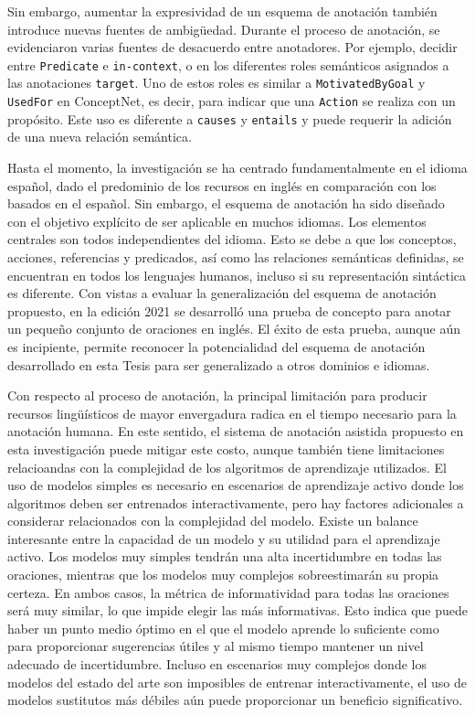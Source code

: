 Sin embargo, aumentar la expresividad de un esquema de anotación también introduce nuevas fuentes de ambigüedad.
Durante el proceso de anotación, se evidenciaron varias fuentes de desacuerdo entre anotadores.
Por ejemplo, decidir entre \texttt{Predicate} e \texttt{in-context}, o en los diferentes roles semánticos asignados a las anotaciones \texttt{target}.
Uno de estos roles es similar a \texttt{MotivatedByGoal} y \texttt{UsedFor} en ConceptNet, es decir, para indicar que una \texttt{Action} se realiza con un propósito.
Este uso es diferente a \texttt{causes} y \texttt{entails} y puede requerir la adición de una nueva relación semántica.

Hasta el momento, la investigación se ha centrado fundamentalmente en el idioma español, dado el predominio de los recursos en inglés en comparación con los basados en el español.
Sin embargo, el esquema de anotación ha sido diseñado con el objetivo explícito de ser aplicable en muchos idiomas.
Los elementos centrales son todos independientes del idioma.
Esto se debe a que los conceptos, acciones, referencias y predicados, así como las relaciones semánticas definidas, se encuentran en todos los lenguajes humanos, incluso si su representación sintáctica es diferente.
Con vistas a evaluar la generalización del esquema de anotación propuesto, en la edición 2021 se desarrolló una prueba de concepto para anotar un pequeño conjunto de oraciones en inglés.
El éxito de esta prueba, aunque aún es incipiente, permite reconocer la potencialidad del esquema de anotación desarrollado en esta Tesis para ser generalizado a otros dominios e idiomas.

Con respecto al proceso de anotación, la principal limitación para producir recursos lingüísticos de mayor envergadura radica en el tiempo necesario para la anotación humana.
En este sentido, el sistema de anotación asistida propuesto en esta investigación puede mitigar este costo, aunque también tiene limitaciones relacioandas con la complejidad de los algoritmos de aprendizaje utilizados.
El uso de modelos simples es necesario en escenarios de aprendizaje activo donde los algoritmos deben ser entrenados interactivamente, pero hay factores adicionales a considerar relacionados con la complejidad del modelo.
Existe un balance interesante entre la capacidad de un modelo y su utilidad para el aprendizaje activo.
Los modelos muy simples tendrán una alta incertidumbre en todas las oraciones, mientras que los modelos muy complejos sobreestimarán su propia certeza.
En ambos casos, la métrica de informatividad para todas las oraciones será muy similar, lo que impide elegir las más informativas.
Esto indica que puede haber un punto medio óptimo en el que el modelo aprende lo suficiente como para proporcionar sugerencias útiles y al mismo tiempo mantener un nivel adecuado de incertidumbre.
Incluso en escenarios muy complejos donde los modelos del estado del arte son imposibles de entrenar interactivamente, el uso de modelos sustitutos más débiles aún puede proporcionar un beneficio significativo.
